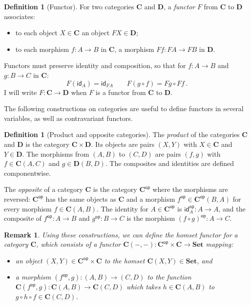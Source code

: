 \documentclass[11pt,oneside,draft]{book}
\newtheorem{remark}[theorem]{Remark}
\theoremstyle{definition}
\newtheorem{definition}[theorem]{Definition}
\newcommand{\kw}[1]{\ensuremath{ \mathsf{#1} }}
\begin{document}
\begin{definition}[Functor] \label{def:functor} %
For two categories $\mathbf{C}$ and $\mathbf{D}$,
a \emph{functor} $F$ from $\mathbf{C}$ to $\mathbf{D}$
associates:
\begin{itemize}
  \item
    to each object $X \in \mathbf{C}$ an object $F X \in \mathbf{D}$;
  \item
    to each morphism $f : A \rightarrow B$ in $\mathbf{C}$,
    a morphism $F f : F A \rightarrow F B$ in $\mathbf{D}$.
\end{itemize}
Functors must preserve identity and composition,
so that for
$f : A \rightarrow B$ and
$g : B \rightarrow C$ in $\mathbf{C}$:
\[
  F (\kw{id}_A) = \kw{id}_{F A}
  \qquad
  F (g \circ f) = F g \circ F f
  \,.
\]
I will write $F : \mathbf{C} \rightarrow \mathbf{D}$
when $F$ is a functor from $\mathbf{C}$ to $\mathbf{D}$.
\end{definition}

The following constructions on categories
are useful to define functors in several variables,
as well as contravariant functors.

\begin{definition}[Product and opposite categories] %
  The \emph{product} of the categories $\mathbf{C}$ and $\mathbf{D}$
  is the category $\mathbf{C} \times \mathbf{D}$.
  Its objects are pairs $(X, Y)$ with $X \in \mathbf{C}$ and $Y \in \mathbf{D}$.
  The morphisms from $(A, B)$ to $(C, D)$
  are pairs $(f, g)$ with $f \in \mathbf{C}(A, C)$ and $g \in \mathbf{D}(B, D)$.
  The composites and identities are defined componentwise.

  The \emph{opposite} of a category $\mathbf{C}$
  is the category $\mathbf{C}^\kw{op}$
  where the morphisms are reversed:
  $\mathbf{C}^\kw{op}$ has the same objects as $\mathbf{C}$
  and a morphism $f^\kw{op} \in \mathbf{C}^\kw{op}(B, A)$
  for every morphism $f \in \mathbf{C}(A, B)$.
  The identity for $A \in \mathbf{C}^\kw{op}$ is
  $\kw{id}_A^\kw{op} : A \rightarrow A$,
  and the composite of $f^\kw{op} : A \rightarrow B$ and
  $g^\kw{op} : B \rightarrow C$ is
  the morphism $(f \circ g)^\kw{op} : A \rightarrow C$.
\end{definition}

\begin{remark} %
Using these constructions,
we can define the \emph{homset} functor
for a category $\mathbf{C}$,
which consists of a functor
$\mathbf{C}(-, -) :
 \mathbf{C}^\kw{op} \times \mathbf{C} \rightarrow
 \mathbf{Set}$
mapping:
\begin{itemize}
  \item an object $(X, Y) \in \mathbf{C}^\kw{op} \times \mathbf{C}$
    to the homset $\mathbf{C}(X, Y) \in \mathbf{Set}$, and
  \item a morphism $(f^\kw{op}, g) : (A, B) \rightarrow (C, D)$
    to the function
    $\mathbf{C}(f^\kw{op}, g) : \mathbf{C}(A, B) \rightarrow \mathbf{C}(C, D)$
    which takes $h \in \mathbf{C}(A, B)$
    to $g \circ h \circ f \in \mathbf{C}(C, D)$.
\end{itemize}
\end{remark}
\end{document}
